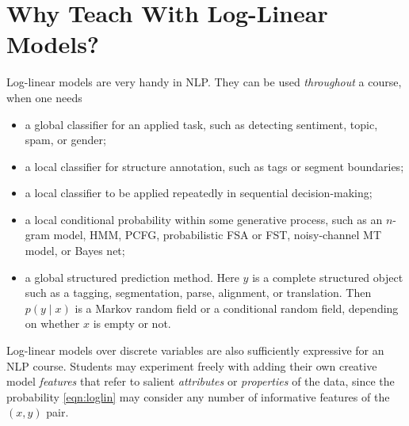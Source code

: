 \documentclass[11pt,letterpaper]{article}
\begin{document}
\section{Why Teach With Log-Linear Models?}\label{sec:whyloglin}

Log-linear models are very handy in NLP.  They can be used {\em throughout} 
a course, when one needs 
\begin{itemize}
\item a global classifier for an applied task, such as detecting
  sentiment, topic, spam, or gender;
\item a local classifier for structure annotation,
  such as tags or segment boundaries;
\item a local classifier to be applied repeatedly in sequential decision-making;
\item a local conditional probability within some generative process, such
  as an $n$-gram model, HMM, PCFG, probabilistic FSA or FST, noisy-channel MT model,
  or Bayes net;
\item a global structured prediction method.  Here $y$ is a complete
  structured object such as a tagging, segmentation, parse, alignment, or translation.  Then $p(y
  \mid x)$ is a Markov random field or a conditional random field,
  depending on whether $x$ is empty or not.
\end{itemize}  

Log-linear models over discrete variables are also sufficiently
expressive for an NLP course.  Students may experiment freely with
adding their own creative model \textit{features} that refer to 
salient \textit{attributes} or \textit{properties} of the data, 
since the probability \eqref{eqn:loglin} may consider any number of
informative features of the $(x,y)$ pair.
\end{document}
